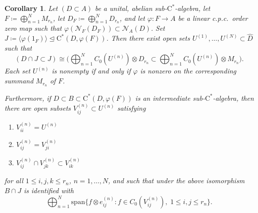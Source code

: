 \documentclass[11pt,a4paper]{amsart}
\newtheorem{corollary}[theorem]{Corollary}
\theoremstyle{definition}
\numberwithin{equation}{section}
\newcommand{\mc}[1]{\mathcal{#1}}
\begin{document}
\begin{corollary}\label{cor:ideal-subhom}
Let $(D\subset A)$ be a unital, abelian sub-$\mathrm{C}^\ast$-algebra, let $F\coloneqq \bigoplus_{n=1}^NM_{r_n}$, let $D_F\coloneqq \bigoplus_{n=1}^ND_{r_n}$, and let $\varphi\colon F\to A$ be a linear c.p.c.\ order zero map such that $\varphi(\mc{N}_F(D_F))\subset\mc{N}_A(D)$. Set $J\coloneqq \langle \varphi(1_F)\rangle \trianglelefteq \mathrm{C}^\ast(D,\varphi(F))$. Then there exist open sets $U^{(1)},\dots, U^{(N)}\subset \widehat{D}$ such that
\begin{equation}\label{eq:identification-j}
(D\cap J \subset J)\cong \bigg(\bigoplus_{n=1}^N C_0(U^{(n)})\otimes D_{r_n}\subset \bigoplus_{n=1}^N C_0(U^{(n)})\otimes M_{r_n}\bigg).
\end{equation}
Each set $U^{(n)}$ is nonempty if and only if $\varphi$ is nonzero on the corresponding summand $M_{r_n}$ of $F$.

Furthermore, if $D\subset B\subset \mathrm{C}^\ast(D,\varphi(F))$ is an intermediate sub-$\mathrm{C}^\ast$-algebra, then there are open subsets $V_{ij}^{(n)}\subset U^{(n)}$ satisfying
\begin{enumerate}[label=\normalfont{(\roman*)}]
\item\label{item:setsVij-i} $V_{ii}^{(n)}=U^{(n)}$
\item\label{item:setsVij-ii} $V_{ij}^{(n)}=V_{ji}^{(n)}$
\item\label{item:setsVij-iii} $V_{ij}^{(n)}\cap V_{jk}^{(n)}\subset V_{ik}^{(n)}$
\end{enumerate}
for all $1\le i,j,k\le r_n$, $n=1,\dots,N$, and such that under the above isomorphism $B\cap J$ is identified with
\begin{equation}\label{eq:bcapj}
\bigoplus_{n=1}^N\mathrm{span}\{f\otimes e_{ij}^{(n)}: f\in C_0(V_{ij}^{(n)}),\; 1\le i,j\le r_n\}.
\end{equation}
\end{corollary}
\end{document}
